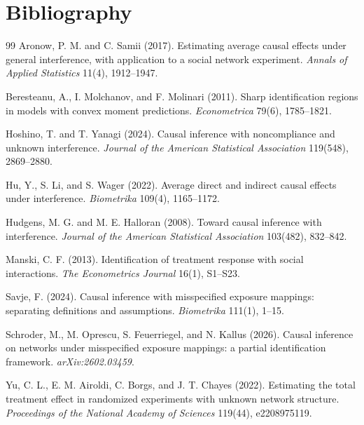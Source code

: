 \documentclass[11pt]{article}
\theoremstyle{definition}
\theoremstyle{plain}
\theoremstyle{remark}
\begin{document}
\section*{Bibliography}
\begin{thebibliography}{99}
Aronow, P. M. and C. Samii (2017).
Estimating average causal effects under general interference, with application
to a social network experiment.
\emph{Annals of Applied Statistics} 11(4), 1912--1947.

Beresteanu, A., I. Molchanov, and F. Molinari (2011).
Sharp identification regions in models with convex moment predictions.
\emph{Econometrica} 79(6), 1785--1821.

Hoshino, T. and T. Yanagi (2024).
Causal inference with noncompliance and unknown interference.
\emph{Journal of the American Statistical Association} 119(548), 2869--2880.

Hu, Y., S. Li, and S. Wager (2022).
Average direct and indirect causal effects under interference.
\emph{Biometrika} 109(4), 1165--1172.

Hudgens, M. G. and M. E. Halloran (2008).
Toward causal inference with interference.
\emph{Journal of the American Statistical Association} 103(482), 832--842.

Manski, C. F. (2013).
Identification of treatment response with social interactions.
\emph{The Econometrics Journal} 16(1), S1--S23.

Savje, F. (2024).
Causal inference with misspecified exposure mappings: separating definitions
and assumptions.
\emph{Biometrika} 111(1), 1--15.

Schroder, M., M. Oprescu, S. Feuerriegel, and N. Kallus (2026).
Causal inference on networks under misspecified exposure mappings: a partial
identification framework.
\emph{arXiv:2602.03459}.

Yu, C. L., E. M. Airoldi, C. Borgs, and J. T. Chayes (2022).
Estimating the total treatment effect in randomized experiments with unknown
network structure.
\emph{Proceedings of the National Academy of Sciences} 119(44), e2208975119.
\end{thebibliography}
\end{document}
